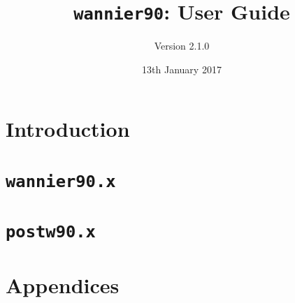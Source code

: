 \documentclass[a4paper,11pt,twoside]{book}
\title{{\tt wannier90}: User Guide}
\author{Version 2.1.0}
\date{13th January 2017}
\begin{document}
\newcommand{\wannier}{\texttt{wannier90}}
\newcommand{\postw}{\texttt{postw90}}
\newcommand{\bw}{\texttt{BoltzWann}}
\newcommand{\pwscf}{\textsc{pwscf}}
\newcommand{\QE}{\textsc{quantum-espresso}}
\newcommand{\Mkb}{\mathbf{M}^{(\mathbf{k},\mathbf{b})}}
\newcommand{\Ak}{\mathbf{A}^{(\mathbf{k})}}
\newcommand{\Uk}{\mathbf{U}^{(\mathbf{k})}}
\newcommand{\cond}{\item[$\star$]}
\newcommand{\omi}{\Omega_{\mathrm{I}}}
\newcommand{\omt}{\widetilde{\Omega}}
\newcommand{\bvec}[1]{\bm{\mathrm{#1}}}

\maketitle

\tableofcontents



\part{Introduction}



\part{\texttt{wannier90.x}\label{part:w90}}



















\part{\texttt{postw90.x}}









\appendix
\part{Appendices}





%



\end{document}
